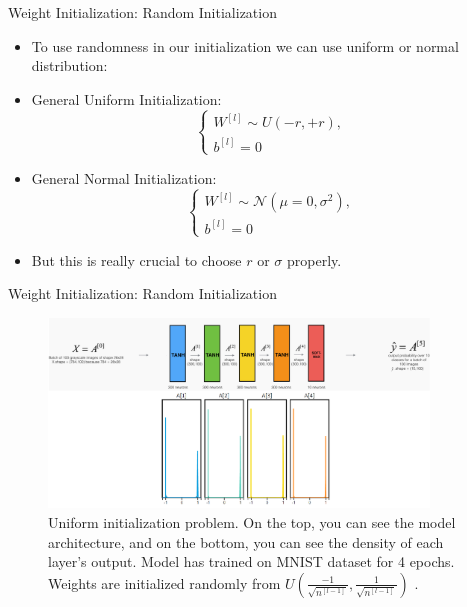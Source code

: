 \documentclass[compress,oilve,t]{beamer}
\begin{document}
\begin{frame}{Weight Initialization: Random Initialization}
	\begin{itemize}
		\item To use randomness in our initialization we can use uniform or normal distribution:
		\medskip
		\item[]\begin{block}{General Uniform Initialization:}
			\[
			\begin{cases}
				W^{[l]} \sim U(-r, +r),\\
				b^{[l]} = 0
			\end{cases}
			\]
		\end{block}
		\item[]\begin{block}{General Normal Initialization:}
			\[
			\begin{cases}
				W^{[l]} \sim \mathcal{N}(\mu=0, \sigma^2),\\
				b^{[l]} = 0
			\end{cases}
			\]
		\end{block}
		\item But this is really crucial to choose $r$ or $\sigma$ properly.
	\end{itemize}
\end{frame}

\begin{frame}{Weight Initialization: Random Initialization}
	\begin{figure}[H]
		\centering
		\includegraphics[width=0.9\textwidth]{Figs/normal-init.png}
		\caption{Uniform initialization problem. On the top, you can see the model architecture, and on the bottom, you can see the density of each layer's output. Model has trained on MNIST dataset for 4 epochs. Weights are initialized randomly from $U(\frac{-1}{\sqrt{n^{[l-1]}}}, \frac{1}{\sqrt{n^{[l-1]}}})$ \cite{katanforoosh-kunin}.}
	\end{figure}
\end{frame}
\end{document}
